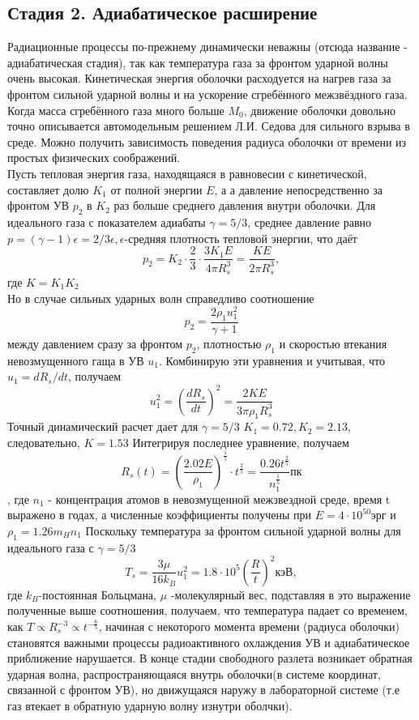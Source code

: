 \documentclass[a4paper,12pt]{extarticle}
\begin{document}
\subsection{Стадия 2. Адиабатическое расширение} 
Радиационные процессы по-прежнему динамически неважны (отсюда название - адиабатическая стадия), так как температура газа за фронтом ударной волны очень высокая. Кинетическая энергия оболочки расходуется на нагрев газа за фронтом сильной ударной волны и на ускорение сгребённого межзвёздного газа. Когда масса сгребённого газа много больше $M_0$, движение оболочки довольно точно описывается автомодельным решением Л.И. Седова для сильного взрыва в среде. Можно получить зависимость поведения радиуса оболочки от времени из простых физических соображений. \\
Пусть тепловая энергия газа, находящаяся в равновесии с кинетической, составляет долю $K_1$ от полной энергии $E$, а а давление непосредственно за фронтом УВ $p_2$ в $K_2$ раз больше среднего давления внутри оболочки. Для идеального газа с показателем адиабаты $\gamma=5/3$, среднее давление равно $p=(\gamma-1)\epsilon=2/3\epsilon, \epsilon$-средняя плотность тепловой энергии, что даёт 
$$p_2=K_2\cdot \frac{2}{3}\cdot \frac{3K_1E}{4\pi R_s^3}=\frac{KE}{2\pi R_s^3},$$
где $K=K_1K_2$\\
Но в случае сильных ударных волн справедливо соотношение
$$p_2=\frac{2\rho_1u_1^2}{\gamma+1}$$
между давлением сразу за фронтом $p_2$, плотностью $\rho_1$ и скоростью втекания невозмущенного гаща в УВ $u_1$. Комбинирую эти уравнения и учитывая, что $u_1=dR_s/dt$, получаем $$u_1^2=\left(\frac{dR_s}{dt}\right)^2=\frac{2KE}{3\pi \rho_1 R_s^3}$$
Точный динамический расчет дает для $\gamma=5/3$ $K_1=0.72,K_2=2.13$, следовательно, $K=1.53$
Интегрируя последнее уравнение, получаем 
$$R_s(t)=\left(\frac{2.02E}{\rho_1}\right)^{\frac{1}{5}}\cdot t^{\frac{2}{5}}=\frac{0.26t^{\frac{2}{5}}}{n_1^{\frac{1}{5}}} \text{пк}$$,
где $n_1$ - концентрация атомов в невозмущенной межзвездной среде, время t выражено в годах, а численные коэффициенты получены при $E=4\cdot 10^{50}$эрг и $\rho_1=1.26m_Hn_1$ 
Поскольку температура за фронтом сильной ударной волны для идеального газа с $\gamma=5/3$
$$T_s = \frac{3\mu}{16k_B}u_1^2=1.8\cdot 10^5 \left(\frac{R}{t} \right)^2\text{кэВ},$$
где $k_B$-постоянная Больцмана, $\mu$ -молекулярный вес,
подставляя в это выражение полученные выше соотношения, получаем, что температура падает со временем, как 
$T \propto R_s^{-3} \propto t^{-\frac{6}{5}}$, начиная с некоторого момента времени (радиуса оболочки) становятся важными процессы радиоактивного охлаждения УВ и адиабатическое приближение нарушается. 
В конце стадии свободного разлета возникает обратная ударная волна, распространяющаяся внутрь оболочки(в системе координат, связанной с фронтом УВ), но движущаяся наружу в лабораторной системе (т.е газ втекает в обратную ударную волну изнутри оболчки). 
\end{document}
